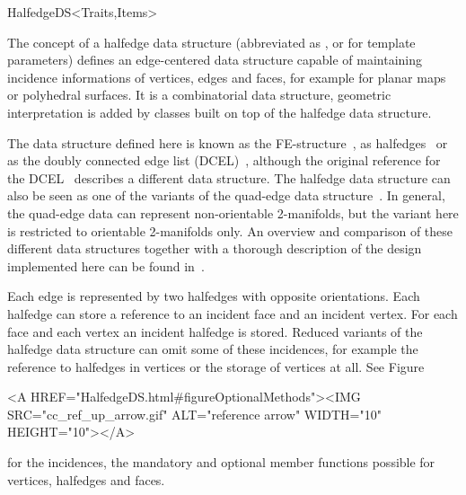 
\ccRefPageBegin



\begin{ccRefConcept}{HalfedgeDS<Traits,Items>}

\ccTagFullDeclarations

\ccDefinition
  
The concept of a halfedge data structure (abbreviated as \ccRefName, or
 for template parameters) defines an edge-centered data structure
capable of maintaining incidence informations of vertices, edges and
faces, for example for planar maps or polyhedral surfaces. It is a
combinatorial data structure, geometric interpretation is added by
classes built on top of the halfedge data structure.

The data structure defined here is known as the
FE-structure~\cite{w-ebdss-85}, as
halfedges~\cite{m-ism-88,bfh-mgedm-95} or as the doubly connected edge
list (DCEL)~\cite{bkos-cgaa-97}, although the original reference for
the DCEL~\cite{mp-fitcp-78} describes a different data structure. The
halfedge data structure can also be seen as one of the variants of the
quad-edge data structure~\cite{gs-pmgsc-85}. In general, the quad-edge
data can represent non-orientable 2-manifolds, but the variant here is
restricted to orientable 2-manifolds only. An overview and comparison
of these different data structures together with a thorough
description of the design implemented here can be found
in~\cite{k-ugpdd-99}.

Each edge is represented by two halfedges with opposite orientations.
Each halfedge can store a reference to an incident face and an
incident vertex.  For each face and each vertex an incident halfedge
is stored.  Reduced variants of the halfedge data structure can omit
some of these incidences, for example the reference to halfedges in
vertices or the storage of vertices at all. See 
Figure~\ccTexHtml{\ref{figureOptionalMethods}}{}\begin{ccHtmlOnly}
  <A HREF="HalfedgeDS.html#figureOptionalMethods"><IMG 
  SRC="cc_ref_up_arrow.gif" ALT="reference arrow" WIDTH="10" HEIGHT="10"></A>
\end{ccHtmlOnly}
for the incidences, the mandatory and optional member functions
possible for vertices, halfedges and faces.


\end{ccRefConcept}
